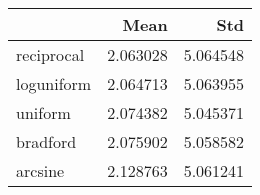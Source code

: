 \begin{tabular}{lrr}
\toprule
{} &      Mean &       Std \\
\midrule
reciprocal &  2.063028 &  5.064548 \\
loguniform &  2.064713 &  5.063955 \\
uniform    &  2.074382 &  5.045371 \\
bradford   &  2.075902 &  5.058582 \\
arcsine    &  2.128763 &  5.061241 \\
\bottomrule
\end{tabular}
